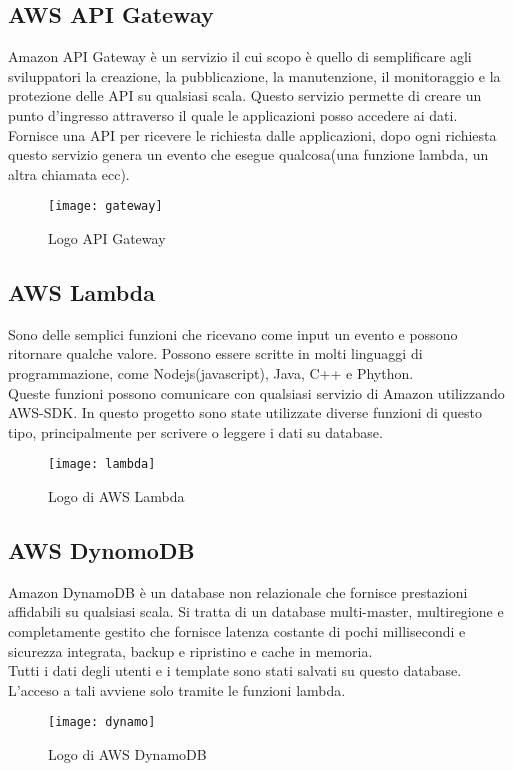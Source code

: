 \subsection{AWS API Gateway} Amazon API Gateway è un servizio il cui scopo è quello di semplificare agli sviluppatori
la creazione, la pubblicazione, la manutenzione, il monitoraggio e la protezione
delle API su qualsiasi scala.
Questo servizio permette di creare un punto d'ingresso attraverso il quale le applicazioni posso accedere ai dati. Fornisce una API per ricevere le richiesta dalle applicazioni, dopo ogni richiesta questo servizio genera un evento che esegue qualcosa(una funzione lambda, un altra chiamata ecc).
\begin{figure}[!h] 
	\centering 
	\texttt{[image: gateway]}
	\caption{Logo API Gateway}
\end{figure}

\subsection{AWS Lambda} 

Sono delle semplici funzioni che ricevano come input un evento e possono ritornare qualche valore. Possono essere scritte in molti linguaggi di programmazione, come Nodejs(javascript), Java, C++ e Phython. 
\\

Queste funzioni possono comunicare con qualsiasi servizio di Amazon utilizzando AWS-SDK. In questo progetto sono state utilizzate diverse funzioni di questo tipo, principalmente per scrivere o leggere i dati su database.
\begin{figure}[!h] 
	\centering 
	\texttt{[image: lambda]}
	\caption{Logo di AWS Lambda}
\end{figure}  

\subsection{AWS DynomoDB} 
Amazon DynamoDB è un database non relazionale che fornisce prestazioni affidabili su qualsiasi scala. Si tratta di un database multi-master, multiregione e completamente gestito che fornisce latenza costante di pochi millisecondi e sicurezza integrata, backup e ripristino e cache in memoria.
\\

 Tutti i dati degli utenti e i template sono stati salvati su questo database. L'acceso a tali avviene solo tramite le funzioni lambda.   
\begin{figure}[!h] 
	\centering 
	\texttt{[image: dynamo]}
	\caption{Logo di AWS DynamoDB}
\end{figure}


